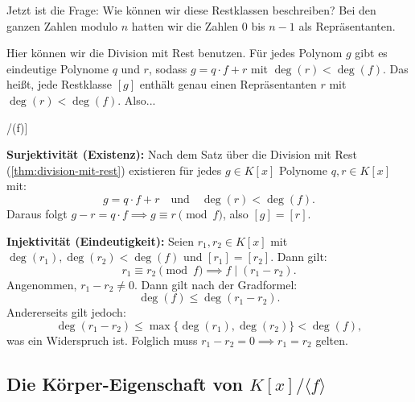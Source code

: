 \begin{spoken-clean}[00:48:22 - 00:53:37]
Jetzt ist die Frage: Wie können wir diese Restklassen beschreiben? Bei den ganzen Zahlen modulo $n$ hatten wir die Zahlen $0$ bis $n-1$ als Repräsentanten.

Hier können wir die Division mit Rest benutzen. Für jedes Polynom $g$ gibt es eindeutige Polynome $q$ und $r$, sodass $g = q \cdot f + r$ mit $\deg(r) < \deg(f)$. Das heißt, jede Restklasse $[g]$ enthält genau einen Repräsentanten $r$ mit $\deg(r) < \deg(f)$. Also...
\end{spoken-clean}

\begin{math-stroke}[Repräsentantensystem für K[x]/(f)]

\begin{short-proof}
\textbf{Surjektivität (Existenz):} Nach dem Satz über die Division mit Rest (\cref{thm:division-mit-rest}) existieren für jedes $g \in K[x]$ Polynome $q, r \in K[x]$ mit:
\[
g = q \cdot f + r \quad \text{und} \quad \deg(r) < \deg(f).
\]
Daraus folgt $g - r = q \cdot f \implies g \equiv r \pmod f$, also $[g] = [r]$.

\textbf{Injektivität (Eindeutigkeit):} Seien $r_1, r_2 \in K[x]$ mit $\deg(r_1), \deg(r_2) < \deg(f)$ und $[r_1] = [r_2]$. Dann gilt:
\[
r_1 \equiv r_2 \pmod f \implies f \mid (r_1 - r_2).
\]
Angenommen, $r_1 - r_2 \neq 0$. Dann gilt nach der Gradformel:
\[
\deg(f) \le \deg(r_1 - r_2).
\]
Andererseits gilt jedoch:
\[
\deg(r_1 - r_2) \le \max\{\deg(r_1), \deg(r_2)\} < \deg(f),
\]
was ein Widerspruch ist. Folglich muss $r_1 - r_2 = 0 \implies r_1 = r_2$ gelten.
\end{short-proof}
\end{math-stroke}

\subsection{Die Körper-Eigenschaft von \texorpdfstring{$K[x]/\langle f \rangle$}{K[x]/(f)}}

